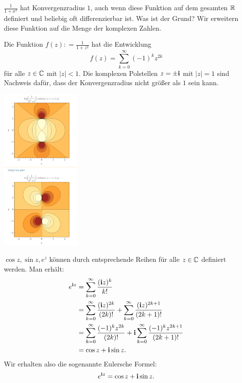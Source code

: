\begin{bsp} 
	$\frac{1}{1+ x^2}$ hat Konvergenzradius $1$, auch wenn diese Funktion auf dem gesamten $\mathbb{R}$ definiert und beliebig oft differenzierbar ist. Was ist der Grund? Wir erweitern diese Funktion auf die Menge der komplexen Zahlen.
	
	Die Funktion $f(z): = \frac{1}{1+z^2}$ hat die Entwicklung 
	\[
		f(z) = \sum_{k=0}^\infty (-1)^k z^{2 k}
	\]
	für alle $z \in \mathbb{C}$ mit $|z| < 1$.  Die komplexen Polstellen $z = \pm \mathbf{i}$ mit $|z|=1$ sind Nachweis dafür, dass der Konvergenzradius nicht größer als $1$ sein kann. 
	
	\begin{center} 
		\includegraphics[width=0.3\textwidth]{pics/WolframComplexPlot.png}
	\end{center} 
\end{bsp} 

\begin{bem}
	$\cos z, \sin z, e^z$ können durch entsprechende Reihen für alle $z \in \mathbb{C}$ definiert werden. Man erhält:  
	\begin{align*}
		e^{\mathbf{i} z} & = \sum_{k=0}^\infty \frac{ (\mathbf{i} z)^k }{k!} 
					\\ & =\sum_{k=0}^\infty \frac{ (\mathbf{i} z)^{2 k} }{(2 k)!}  + \sum_{k=0}^\infty \frac{ (\mathbf{i} z)^{2 k +1} }{(2 k+1)!} 
					\\ & = \sum_{k=0}^\infty \frac{ (-1)^k z^{2 k} }{(2 k)!}
					 + \mathbf{i} \sum_{k=0}^\infty \frac{(-1)^k z^{2 k +1}}{(2k+1)!}
					 \\ & = \cos z + \mathbf{i} \sin z. 
	\end{align*}
	Wir erhalten also die sogenannte Eulersche Formel:
	\[
		e^{\mathbf{i} z} = \cos z + \mathbf{i} \sin z. 
	\]
\end{bem} 

